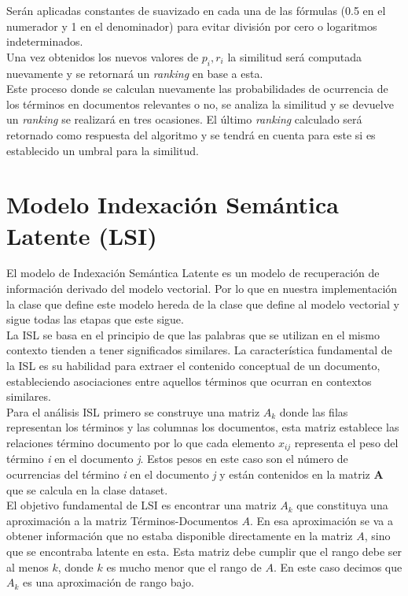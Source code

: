 \documentclass[spanish]{article}
\begin{document}
			Serán aplicadas constantes de suavizado en cada una de las fórmulas (0.5 en el numerador y 1 en el denominador) para evitar división por cero o logaritmos indeterminados.\\
			
			Una vez obtenidos los nuevos valores de $ p_i, r_i $ la similitud será computada nuevamente y se retornará un \emph{ranking} en base a esta.\\

			Este proceso donde se calculan nuevamente las probabilidades de ocurrencia de los términos en documentos relevantes o no, se analiza la similitud y se devuelve un \emph{ranking} se realizará en tres ocasiones. El último \emph{ranking} calculado será retornado como respuesta del algoritmo y se tendrá en cuenta para este si es establecido un umbral para la similitud.


\section*{ Modelo Indexación Semántica Latente (LSI)}

El modelo de Indexación Semántica Latente es un modelo de recuperación de información derivado del modelo vectorial. Por lo que en nuestra implementación la clase que define este modelo hereda de la clase que define al modelo vectorial y sigue todas las etapas que este sigue.\\

La ISL se basa en el principio de que las palabras que se utilizan en el mismo contexto tienden a tener significados similares. La característica fundamental de la ISL es su habilidad para extraer el contenido conceptual de un documento, estableciendo asociaciones entre aquellos términos que ocurran en contextos similares. \\

Para el análisis ISL primero se construye una matriz ${\displaystyle A_{k}}$ donde las filas representan los términos y las columnas los documentos, esta matriz establece las relaciones término documento por lo que cada elemento  $x_{ij}$  representa el peso del término \textit{i} en el documento \textit{j}. Estos pesos en este caso son el número de ocurrencias del término \textit{i} en el documento \textit{j} y están contenidos en la matriz \textbf{A} que se calcula en la clase dataset.\\

El objetivo fundamental de LSI es encontrar una matriz ${\displaystyle A_{k}}$ que constituya una aproximación a la matriz Términos-Documentos ${\displaystyle A}$. En esa aproximación se va a obtener información que no estaba disponible directamente en la matriz ${\displaystyle A}$, sino que se encontraba latente en esta. Esta matriz debe cumplir que el rango debe ser al menos ${\displaystyle k}$, donde ${\displaystyle k}$ es mucho menor que el rango de ${\displaystyle A}$. En este caso decimos que ${\displaystyle A_{k}}$ es una aproximación de rango bajo.\\
\end{document}
